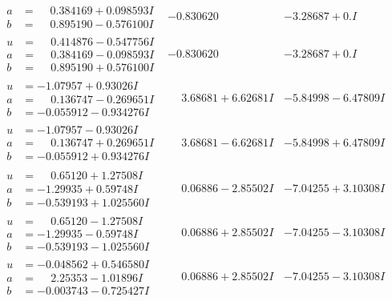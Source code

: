 \documentclass[1p]{elsarticle_modified}
\theoremstyle{definition}
\begin{document}
$$\begin{array}{c|c|c}
\begin{aligned}
a &= \phantom{-}0.384169 + 0.098593 I \\
b &= \phantom{-}0.895190 - 0.576100 I\end{aligned}
 & -0.830620\phantom{ +0.000000I} & -3.28687 + 0. I\phantom{ +0.000000I} \\ \hline\begin{aligned}
u &= \phantom{-}0.414876 - 0.547756 I \\
a &= \phantom{-}0.384169 - 0.098593 I \\
b &= \phantom{-}0.895190 + 0.576100 I\end{aligned}
 & -0.830620\phantom{ +0.000000I} & -3.28687 + 0. I\phantom{ +0.000000I} \\ \hline\begin{aligned}
u &= -1.07957 + 0.93026 I \\
a &= \phantom{-}0.136747 - 0.269651 I \\
b &= -0.055912 - 0.934276 I\end{aligned}
 & \phantom{-}3.68681 + 6.62681 I & -5.84998 - 6.47809 I \\ \hline\begin{aligned}
u &= -1.07957 - 0.93026 I \\
a &= \phantom{-}0.136747 + 0.269651 I \\
b &= -0.055912 + 0.934276 I\end{aligned}
 & \phantom{-}3.68681 - 6.62681 I & -5.84998 + 6.47809 I \\ \hline\begin{aligned}
u &= \phantom{-}0.65120 + 1.27508 I \\
a &= -1.29935 + 0.59748 I \\
b &= -0.539193 + 1.025560 I\end{aligned}
 & \phantom{-}0.06886 - 2.85502 I & -7.04255 + 3.10308 I \\ \hline\begin{aligned}
u &= \phantom{-}0.65120 - 1.27508 I \\
a &= -1.29935 - 0.59748 I \\
b &= -0.539193 - 1.025560 I\end{aligned}
 & \phantom{-}0.06886 + 2.85502 I & -7.04255 - 3.10308 I \\ \hline\begin{aligned}
u &= -0.048562 + 0.546580 I \\
a &= \phantom{-}2.25353 - 1.01896 I \\
b &= -0.003743 - 0.725427 I\end{aligned}
 & \phantom{-}0.06886 + 2.85502 I & -7.04255 - 3.10308 I \\ \hline\begin{aligned}

\end{aligned}
\end{array}$$
\end{document}
